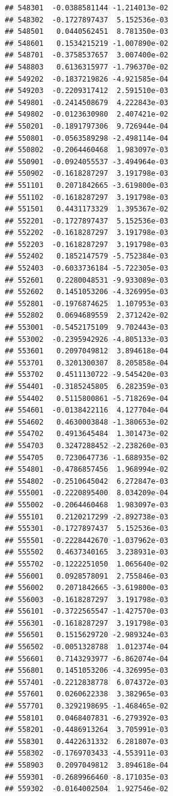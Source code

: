 \begin{frame}[fragile]
\begin{verbatim}
## 548301  -0.0388581144 -1.214013e-02
## 548302  -0.1727897437  5.152536e-03
## 548501   0.0440562451  8.781350e-03
## 548601   0.1534215219 -1.007890e-02
## 548701  -0.3758537657  3.007400e-02
## 548803   0.6136315977 -1.796370e-02
## 549202  -0.1837219826 -4.921585e-04
## 549203  -0.2209317412  2.591510e-03
## 549801  -0.2414508679  4.222843e-03
## 549802  -0.0123630980  2.407421e-02
## 550201  -0.1891797306  9.726944e-04
## 550801  -0.0563589298 -2.498114e-04
## 550802  -0.2064460468  1.983097e-03
## 550901  -0.0924055537 -3.494964e-03
## 550902  -0.1618287297  3.191798e-03
## 551101   0.2071842665 -3.619800e-03
## 551102  -0.1618287297  3.191798e-03
## 551501   0.4431173329  1.395367e-02
## 552201  -0.1727897437  5.152536e-03
## 552202  -0.1618287297  3.191798e-03
## 552203  -0.1618287297  3.191798e-03
## 552402   0.1852147579 -5.752384e-03
## 552403  -0.6033736184 -5.722305e-03
## 552601   0.2280048531 -9.933089e-03
## 552602   0.1451053206 -4.326995e-03
## 552801  -0.1976874625  1.107953e-03
## 552802   0.0694689559  2.371242e-02
## 553001  -0.5452175109  9.702443e-03
## 553002  -0.2395942926 -4.805133e-03
## 553601   0.2097049812  3.894618e-04
## 553701   0.3201300307  8.205858e-04
## 553702   0.4511130722 -9.545420e-03
## 554401  -0.3185245805  6.282359e-03
## 554402   0.5115800861 -5.718269e-04
## 554601  -0.0138422116  4.127704e-04
## 554602   0.4630003848 -1.380653e-02
## 554702   0.4913645484  1.301473e-02
## 554703   0.3247288452 -2.238260e-03
## 554705   0.7230647736 -1.688935e-02
## 554801  -0.4786857456  1.968994e-02
## 554802  -0.2510645042  6.272847e-03
## 555001  -0.2220895400  8.034209e-04
## 555002  -0.2064460468  1.983097e-03
## 555101   0.2120217299 -2.892738e-03
## 555301  -0.1727897437  5.152536e-03
## 555501  -0.2228442670 -1.037962e-03
## 555502   0.4637340165  3.238931e-03
## 555702  -0.1222251050  1.065640e-02
## 556001   0.0928578091  2.755846e-03
## 556002   0.2071842665 -3.619800e-03
## 556003  -0.1618287297  3.191798e-03
## 556101  -0.3722565547 -1.427570e-03
## 556301  -0.1618287297  3.191798e-03
## 556501   0.1515629720 -2.989324e-03
## 556502  -0.0051328788  1.012374e-04
## 556601   0.7143293977 -6.862074e-04
## 556801   0.1451053206 -4.326995e-03
## 557401  -0.2212838778  6.074372e-03
## 557601   0.0260622338  3.382965e-03
## 557701   0.3292198695 -1.468465e-02
## 558101   0.0468407831 -6.279392e-03
## 558201  -0.4486913264  3.705991e-03
## 558301   0.4422631332  6.281807e-03
## 558302  -0.1769703433 -4.553911e-03
## 558903   0.2097049812  3.894618e-04
## 559301  -0.2689966460 -8.171035e-03
## 559302  -0.0164002504  1.927546e-02

\end{verbatim}
\end{frame}
